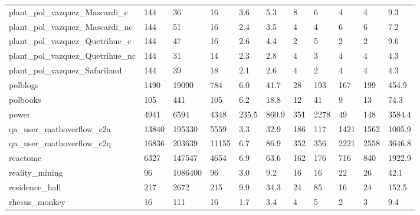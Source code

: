 \begin{longtable}{lllllllllll}
 plant\_pol\_vazquez\_Mascardi\_c                       & 144        & 36        & 16    & 3.6    & 5.3    & 8     & 6      & 4      & 4      & 9.3     \\
 plant\_pol\_vazquez\_Mascardi\_nc                      & 144        & 51        & 16    & 2.4    & 3.5    & 4     & 4      & 6      & 6      & 7.2     \\
 plant\_pol\_vazquez\_Quetrihue\_c                      & 144        & 47        & 16    & 2.6    & 4.4    & 2     & 5      & 2      & 2      & 9.6     \\
 plant\_pol\_vazquez\_Quetrihue\_nc                     & 144        & 31        & 14    & 2.3    & 2.8    & 4     & 3      & 4      & 4      & 4.3     \\
 plant\_pol\_vazquez\_Safariland                       & 144        & 39        & 18    & 2.1    & 2.6    & 4     & 2      & 4      & 4      & 4.3     \\
 polblogs                                           & 1490       & 19090     & 784   & 6.0    & 41.7   & 28    & 193    & 167    & 199    & 454.9   \\
 polbooks                                           & 105        & 441       & 105   & 6.2    & 18.8   & 12    & 41     & 9      & 13     & 74.3    \\
 power                                              & 4941       & 6594      & 4348  & 235.5  & 860.9  & 351   & 2278   & 49     & 148    & 3584.4  \\
 qa\_user\_mathoverflow\_c2a                           & 13840      & 195330    & 5559  & 3.3    & 32.9   & 186   & 117    & 1421   & 1562   & 1005.9  \\
 qa\_user\_mathoverflow\_c2q                           & 16836      & 203639    & 11155 & 6.7    & 86.9   & 352   & 356    & 2221   & 2558   & 3646.8  \\
 reactome                                           & 6327       & 147547    & 4654  & 6.9    & 63.6   & 162   & 176    & 716    & 840    & 1922.9  \\
 reality\_mining                                     & 96         & 1086400   & 96    & 3.0    & 9.2    & 16    & 16     & 22     & 26     & 42.1    \\
 residence\_hall                                     & 217        & 2672      & 215   & 9.9    & 34.3   & 24    & 85     & 16     & 24     & 152.5   \\
 rhesus\_monkey                                      & 16         & 111       & 16    & 1.7    & 3.4    & 4     & 5      & 2      & 3      & 9.4     \\

\end{longtable}
